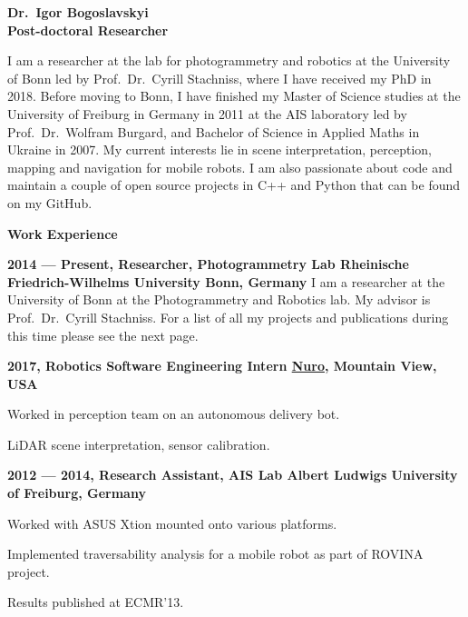 \documentclass[a4paper,12pt,final]{memoir}
\newcommand{\Sep}{\vspace{1.5em}}
\newcommand{\SmallSep}{\vspace{0.5em}}
\newenvironment{AboutMe}
	{\ignorespaces}
	{\Sep\ignorespacesafterend}
\newcommand{\CVSection}[1]
	{\Large\textbf{#1}\par
	\SmallSep\normalsize\normalfont}
\newcommand{\CVItem}[1]
	{\textbf{\color{MidnightBlue} #1}}
\begin{document}
\framebreak{}


\Huge\bfseries {\color{MidnightBlue}Dr.~Igor Bogoslavskyi} \\
\Large\bfseries  Post-doctoral Researcher \\

\normalsize\normalfont{}

\begin{AboutMe}
I am a researcher at the lab for photogrammetry and robotics at the University
of Bonn led by Prof.~Dr.~Cyrill Stachniss, where I have received my PhD in 2018.
Before moving to Bonn, I have finished my Master of Science studies at the
University of Freiburg in Germany in 2011 at the AIS laboratory led by
Prof.~Dr.~Wolfram Burgard, and Bachelor of Science in Applied Maths in Ukraine
in 2007. My current interests lie in scene interpretation, perception, mapping
and navigation for mobile robots. I am also passionate about code and maintain a
couple of open source projects in C++ and Python that can be found on my GitHub.
\end{AboutMe}

\CVSection{Work Experience}
\CVItem{2014 --- Present, Researcher, Photogrammetry Lab
\newline Rheinische Friedrich-Wilhelms University Bonn, Germany}
\newline
I am a researcher at the University of Bonn at the Photogrammetry and Robotics
lab. My advisor is Prof.~Dr.~Cyrill Stachniss. For a list of all my projects and
publications during this time please see the next page.
\SmallSep{}

\CVItem{2017, Robotics Software Engineering Intern
\newline \href{https://nuro.ai/}{Nuro}, Mountain View, USA}
\begin{compactitem}[\color{MidnightBlue}$\circ$]
\item Worked in perception team on an autonomous delivery bot.
\item LiDAR scene interpretation, sensor calibration.
\end{compactitem}

\CVItem{2012 --- 2014, Research Assistant, AIS Lab
\newline Albert Ludwigs University of Freiburg, Germany}
\begin{compactitem}[\color{RoyalBlue}$\circ$]
\item Worked with ASUS Xtion mounted onto various platforms.
\item Implemented traversability analysis for a mobile robot as part of ROVINA
project.
\item Results published at ECMR'13.
\end{compactitem}
\SmallSep{}
\end{document}
